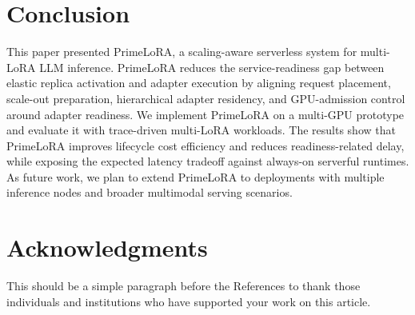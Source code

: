 \documentclass[lettersize,journal]{IEEEtran}
\begin{document}
\section{Conclusion}

This paper presented PrimeLoRA, a scaling-aware serverless system for multi-LoRA LLM inference. PrimeLoRA reduces the service-readiness gap between elastic replica activation and adapter execution by aligning request placement, scale-out preparation, hierarchical adapter residency, and GPU-admission control around adapter readiness. We implement PrimeLoRA on a multi-GPU prototype and evaluate it with trace-driven multi-LoRA workloads. The results show that PrimeLoRA improves lifecycle cost efficiency and reduces readiness-related delay, while exposing the expected latency tradeoff against always-on serverful runtimes. As future work, we plan to extend PrimeLoRA to deployments with multiple inference nodes and broader multimodal serving scenarios.

\section*{Acknowledgments}
This should be a simple paragraph before the References to thank those individuals and institutions who have supported your work on this article.




\vfill
\end{document}
